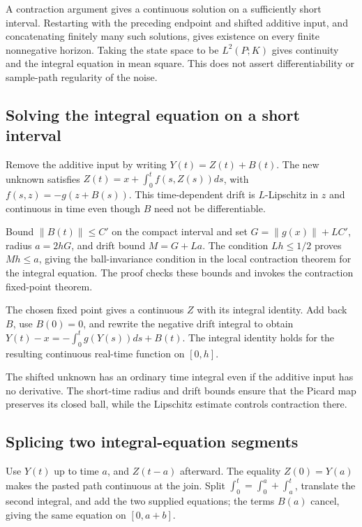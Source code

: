 \documentclass[11pt,a4paper]{article}
\begin{document}
A contraction argument gives a continuous solution on a sufficiently short interval. Restarting with the preceding endpoint and shifted additive input, and concatenating finitely many such solutions, gives existence on every finite nonnegative horizon. Taking the state space to be \(L^2(P;K)\) gives continuity and the integral equation in mean square. This does not assert differentiability or sample-path regularity of the noise.


\subsection{\texorpdfstring{Solving the integral equation on a short interval}{Solving the integral equation on a short interval}}


Remove the additive input by writing \(Y(t)=Z(t)+B(t)\). The new unknown satisfies \(Z(t)=x+\int_0^t f(s,Z(s))ds\), with \(f(s,z)=-g(z+B(s))\). This time-dependent drift is \(L\)-Lipschitz in \(z\) and continuous in time even though \(B\) need not be differentiable.



Bound \(\|B(t)\|\le C'\) on the compact interval and set \(G=\|g(x)\|+LC'\), radius \(a=2hG\), and drift bound \(M=G+La\). The condition \(Lh\le1/2\) proves \(Mh\le a\), giving the ball-invariance condition in the local contraction theorem for the integral equation. The proof checks these bounds and invokes the contraction fixed-point theorem.



The chosen fixed point gives a continuous \(Z\) with its integral identity. Add back \(B\), use \(B(0)=0\), and rewrite the negative drift integral to obtain \(Y(t)-x=-\int_0^tg(Y(s))ds+B(t)\). The integral identity holds for the resulting continuous real-time function on \([0,h]\).



The shifted unknown has an ordinary time integral even if the additive input has no derivative. The short-time radius and drift bounds ensure that the Picard map preserves its closed ball, while the Lipschitz estimate controls contraction there.


\subsection{\texorpdfstring{Splicing two integral-equation segments}{Splicing two integral-equation segments}}


Use \(Y(t)\) up to time \(a\), and \(Z(t-a)\) afterward. The equality \(Z(0)=Y(a)\) makes the pasted path continuous at the join. Split \(\int_0^t=\int_0^a+\int_a^t\), translate the second integral, and add the two supplied equations; the terms \(B(a)\) cancel, giving the same equation on \([0,a+b]\).
\end{document}
